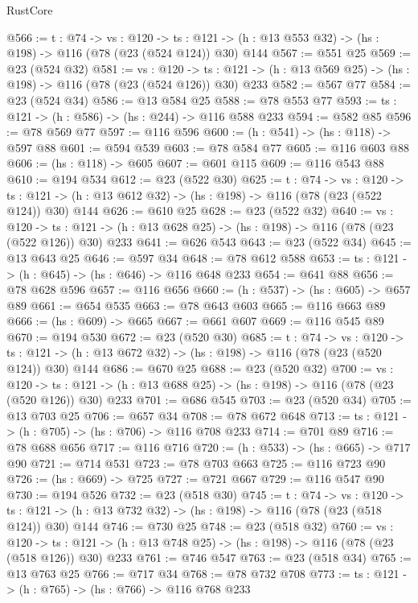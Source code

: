 \begin{lexlean}{RustCore}
\begin{coremodule}
@566 := {t : @74} ->
  {vs : @120} ->
  {ts : @121} -> (h : @13 @553 @32) -> (hs : @198) -> @116 (@78 (@23 (@524 @124)) @30) @144
@567 := @551 @25
@569 := @23 (@524 @32)
@581 := {vs : @120} ->
  {ts : @121} -> (h : @13 @569 @25) -> (hs : @198) -> @116 (@78 (@23 (@524 @126)) @30) @233
@582 := @567 @77
@584 := @23 (@524 @34)
@586 := @13 @584 @25
@588 := @78 @553 @77
@593 := {ts : @121} -> (h : @586) -> (hs : @244) -> @116 @588 @233
@594 := @582 @85
@596 := @78 @569 @77
@597 := @116 @596
@600 := (h : @541) -> (hs : @118) -> @597 @88
@601 := @594 @539
@603 := @78 @584 @77
@605 := @116 @603 @88
@606 := (hs : @118) -> @605
@607 := @601 @115
@609 := @116 @543 @88
@610 := @194 @534
@612 := @23 (@522 @30)
@625 := {t : @74} ->
  {vs : @120} ->
  {ts : @121} -> (h : @13 @612 @32) -> (hs : @198) -> @116 (@78 (@23 (@522 @124)) @30) @144
@626 := @610 @25
@628 := @23 (@522 @32)
@640 := {vs : @120} ->
  {ts : @121} -> (h : @13 @628 @25) -> (hs : @198) -> @116 (@78 (@23 (@522 @126)) @30) @233
@641 := @626 @543
@643 := @23 (@522 @34)
@645 := @13 @643 @25
@646 := @597 @34
@648 := @78 @612 @588
@653 := {ts : @121} -> (h : @645) -> (hs : @646) -> @116 @648 @233
@654 := @641 @88
@656 := @78 @628 @596
@657 := @116 @656
@660 := (h : @537) -> (hs : @605) -> @657 @89
@661 := @654 @535
@663 := @78 @643 @603
@665 := @116 @663 @89
@666 := (hs : @609) -> @665
@667 := @661 @607
@669 := @116 @545 @89
@670 := @194 @530
@672 := @23 (@520 @30)
@685 := {t : @74} ->
  {vs : @120} ->
  {ts : @121} -> (h : @13 @672 @32) -> (hs : @198) -> @116 (@78 (@23 (@520 @124)) @30) @144
@686 := @670 @25
@688 := @23 (@520 @32)
@700 := {vs : @120} ->
  {ts : @121} -> (h : @13 @688 @25) -> (hs : @198) -> @116 (@78 (@23 (@520 @126)) @30) @233
@701 := @686 @545
@703 := @23 (@520 @34)
@705 := @13 @703 @25
@706 := @657 @34
@708 := @78 @672 @648
@713 := {ts : @121} -> (h : @705) -> (hs : @706) -> @116 @708 @233
@714 := @701 @89
@716 := @78 @688 @656
@717 := @116 @716
@720 := (h : @533) -> (hs : @665) -> @717 @90
@721 := @714 @531
@723 := @78 @703 @663
@725 := @116 @723 @90
@726 := (hs : @669) -> @725
@727 := @721 @667
@729 := @116 @547 @90
@730 := @194 @526
@732 := @23 (@518 @30)
@745 := {t : @74} ->
  {vs : @120} ->
  {ts : @121} -> (h : @13 @732 @32) -> (hs : @198) -> @116 (@78 (@23 (@518 @124)) @30) @144
@746 := @730 @25
@748 := @23 (@518 @32)
@760 := {vs : @120} ->
  {ts : @121} -> (h : @13 @748 @25) -> (hs : @198) -> @116 (@78 (@23 (@518 @126)) @30) @233
@761 := @746 @547
@763 := @23 (@518 @34)
@765 := @13 @763 @25
@766 := @717 @34
@768 := @78 @732 @708
@773 := {ts : @121} -> (h : @765) -> (hs : @766) -> @116 @768 @233

\end{coremodule}
\end{lexlean}
